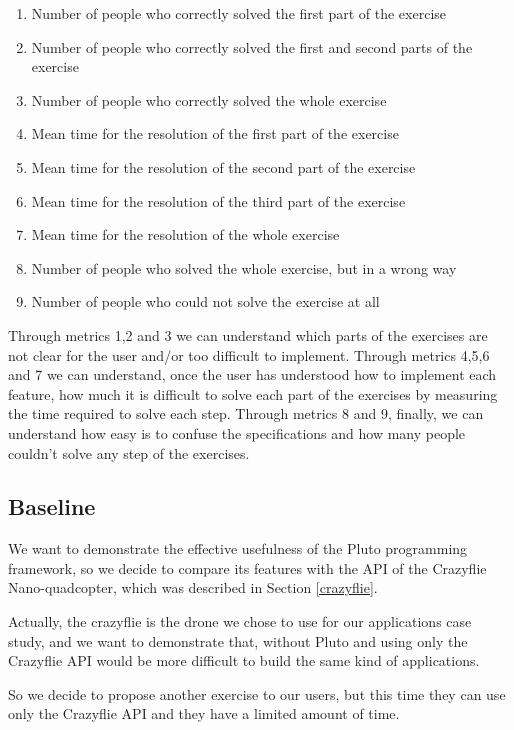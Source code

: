 \begin{enumerate}
\item {Number of people who correctly solved the first part of the exercise}
\item {Number of people who correctly solved the first and second parts of the exercise}
\item {Number of people who correctly solved the whole exercise}
\item {Mean time for the resolution of the first part of the exercise}
\item {Mean time for the resolution of the second part of the exercise}
\item {Mean time for the resolution of the third part of the exercise}
\item {Mean time for the resolution of the whole exercise}
\item {Number of people who solved the whole exercise, but in a wrong way}
\item {Number of people who could not solve the exercise at all}
\end{enumerate}

Through metrics 1,2 and 3 we can understand which parts of the exercises are not clear for the user and/or too difficult to implement. 
Through metrics 4,5,6 and 7 we can understand, once the user has understood how to implement each feature, how much it is difficult to solve each part of the exercises by measuring the time required to solve each step.
Through metrics 8 and 9, finally, we can understand how easy is to confuse the specifications and how many people couldn't solve any step of the exercises.


\subsection{Baseline}\label{baseline}

We want to demonstrate the effective usefulness of the Pluto programming framework, so we decide to compare its features with the API of the Crazyflie Nano-quadcopter, which was described in Section \ref{crazyflie}.

Actually, the crazyflie is the drone we chose to use for our applications case study, and we want to demonstrate that, without Pluto and using only the Crazyflie API would be more difficult to build the same kind of applications.

So we decide to propose another exercise to our users, but this time they can use only the Crazyflie API and they have a limited amount of time.

